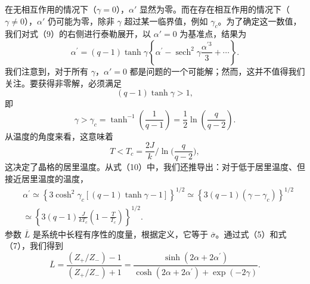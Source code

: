 在无相互作用的情况下（\(\gamma=0\)），\(\alpha'\) 显然为零。而在存在相互作用的情况下（\(\gamma\neq0\)），\(\alpha'\) 仍可能为零，除非 \(\gamma\) 超过某一临界值，例如 \(\gamma_{c}\)。为了确定这一数值，我们对式（9）的右侧进行泰勒展开，以 \(\alpha'=0\) 为基准点，结果为
\begin{equation}\tag{12.5.40}\label{eq:12.5.40}
\alpha ^{\prime} = ( q - 1 ) \operatorname { t a n h } \gamma \left\{ \alpha ^{\prime} - \operatorname { s e c h } ^{2} \gamma \frac { \alpha ^{\prime 3} } { 3 } + \cdots \right\} .
\end{equation}
我们注意到，对于所有 \(\gamma\)，\(\alpha'=0\) 都是问题的一个可能解；然而，这并不值得我们关注。要获得非零解，必须满足
\begin{equation}\tag{12.5.41}\label{eq:12.5.41}
( q - 1 ) \operatorname { t a n h } \gamma > 1 ,
\end{equation}
即
\begin{equation}\tag{12.5.42}\label{eq:12.5.42}
\gamma > \gamma _ { c } = \operatorname { t a n h } ^{- 1} \left( { \frac { 1 } { q - 1 } } \right) = { \frac { 1 } { 2 } } \ln \left( { \frac { q } { q - 2 } } \right) .
\end{equation}
从温度的角度来看，这意味着
\begin{equation}\tag{12.5.43}\label{eq:12.5.43}
T < T _ { c } = \frac { 2 J } { k } \Bigg / \ln \Bigg ( \frac { q } { q - 2 } \Bigg ) ,
\end{equation}
这决定了晶格的居里温度。从式（10）中，我们还推导出：对于低于居里温度、但接近居里温度的温度，
\begin{equation}\tag{12.5.44}\label{eq:12.5.44}
\begin{array}{rl} & { \alpha ^{\prime} \simeq \left\{ 3 \cosh ^{2} \gamma _ { c } \left[ ( q - 1 ) \operatorname { t a n h } \gamma - 1 \right] \right\} ^{1 / 2} \simeq \left\{ 3 ( q - 1 ) ( \gamma - \gamma _ { c } ) \right\} ^{1 / 2} } \\& { \simeq \left\{ 3 ( q - 1 ) \frac { J } { k T _ { c } } \left( 1 - \frac { T } { T _ { c } } \right) \right\} ^{1 / 2} . } \end{array}
\end{equation}
参数 \(\overline{L}\) 是系统中长程有序性的度量，根据定义，它等于 \(\overline{\sigma}\)。通过式（5）和式（7），我们得到
\begin{equation}\tag{12.5.45}\label{eq:12.5.45}
\overline { { L } } = \frac { ( Z _ { + } / Z _ { - } ) - 1 } { ( Z _ { + } / Z _ { - } ) + 1 } = \frac { \sinh ( 2 \alpha + 2 \alpha ^{\prime} ) } { \cosh ( 2 \alpha + 2 \alpha ^{\prime} ) + \exp ( - 2 \gamma ) } .
\end{equation}

